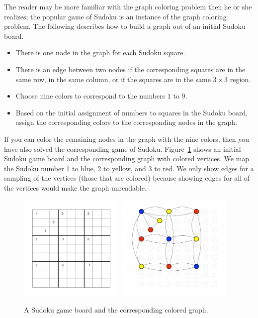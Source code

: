 \documentclass[11pt]{book}
\begin{document}
The reader may be more familiar with the graph coloring problem then he
or she realizes; the popular game of Sudoku is an instance of the
graph coloring problem. The following describes how to build a graph
out of an initial Sudoku board.
\begin{itemize}
\item There is one node in the graph for each Sudoku square.
\item There is an edge between two nodes if the corresponding squares
  are in the same row, in the same column, or if the squares are in
  the same $3\times 3$ region.
\item Choose nine colors to correspond to the numbers $1$ to $9$.
\item Based on the initial assignment of numbers to squares in the
  Sudoku board, assign the corresponding colors to the corresponding
  nodes in the graph.
\end{itemize}
If you can color the remaining nodes in the graph with the nine
colors, then you have also solved the corresponding game of Sudoku.
Figure~\ref{fig:sudoku-graph} shows an initial Sudoku game board and
the corresponding graph with colored vertices.  We map the Sudoku
number 1 to blue, 2 to yellow, and 3 to red.  We only show edges for a
sampling of the vertices (those that are colored) because showing
edges for all of the vertices would make the graph unreadable.

\begin{figure}[tbp]
\includegraphics[width=0.45\textwidth]{figs/sudoku}
\includegraphics[width=0.5\textwidth]{figs/sudoku-graph}
\caption{A Sudoku game board and the corresponding colored graph.}
\label{fig:sudoku-graph}
\end{figure}
\end{document}
